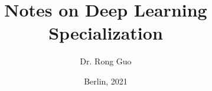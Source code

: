\titlehead{\centering Technische Universität Berlin | Fakultät IV | Neuronale Informationsverarbeitung}
\title{\Large Notes on Deep Learning Specialization}
\author{Dr. Rong Guo}
\date{Berlin, 2021}
\publishers{}

\maketitle

\setcounter{tocdepth}{3}
\setcounter{secnumdepth}{3}
\tableofcontents{}

\clearpage
